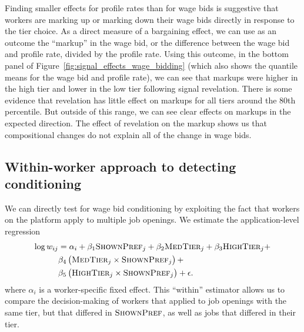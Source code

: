 \documentclass[12pt]{article}
\begin{document}
Finding smaller effects for profile rates than for wage bids is suggestive that workers are marking up or marking down their wage bids directly in response to the tier choice.
As a direct measure of a bargaining effect, we can use as an outcome the ``markup'' in the wage bid, or the difference between the wage bid and profile rate, divided by the profile rate.
Using this outcome, in the bottom panel of Figure~\ref{fig:signal_effects_wage_bidding} (which also shows the quantile means for the wage bid and profile rate), we can see that markups were higher in the high tier and lower in the low tier following signal revelation.
There is some evidence that revelation has little effect on markups for all tiers around the 80th percentile.
But outside of this range, we can see clear effects on markups in the expected direction. 
The effect of revelation on the markup shows us that compositional changes do not explain all of the change in wage bids.

\subsection{Within-worker approach to detecting conditioning}

We can directly test for wage bid conditioning by exploiting the fact that workers on the platform apply to multiple job openings.
We estimate the application-level regression  
\begin{align} \label{eq:bidding}
\log w_{ij} & = \alpha_i + \beta_1 \textsc{ShownPref}_j + \beta_2 \textsc{MedTier}_j + \beta_3 \textsc{HighTier}_j  + \nonumber\\  
           & \beta_4 \left(\textsc{MedTier}_j \times \textsc{ShownPref}_j \right) + \nonumber \\  
           & \beta_5 \left(\textsc{HighTier}_j \times \textsc{ShownPref}_j\right) + \epsilon.  
\end{align}
where $\alpha_i$ is a worker-specific fixed effect. 
This ``within'' estimator allows us to compare the decision-making of workers that applied to job openings with the same tier, but that differed in $\textsc{ShownPref}$, as well as jobs that differed in their tier.
\end{document}
